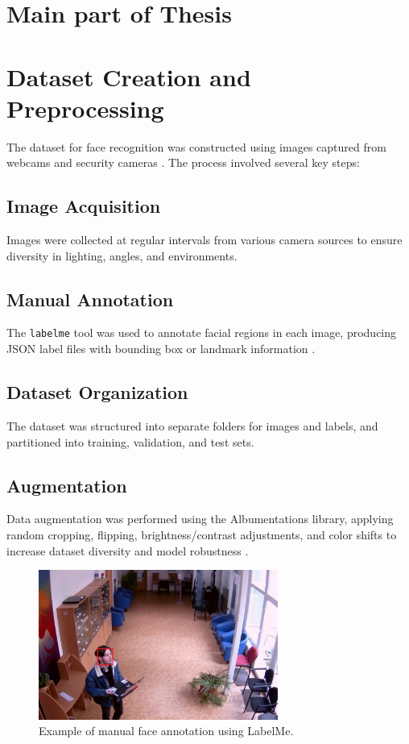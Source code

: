 \section{Main part of Thesis}


\section{Dataset Creation and Preprocessing}

The dataset for face recognition was constructed using images captured from webcams and security cameras \cite{kairos_secret_2018}. The process involved several key steps:

\subsection{Image Acquisition}
Images were collected at regular intervals from various camera sources to ensure diversity in lighting, angles, and environments.

\subsection{Manual Annotation}
The \texttt{labelme} tool was used to annotate facial regions in each image, producing JSON label files with bounding box or landmark information \cite{labelme}.

\subsection{Dataset Organization}
The dataset was structured into separate folders for images and labels, and partitioned into training, validation, and test sets.

\subsection{Augmentation}
Data augmentation was performed using the Albumentations library, applying random cropping, flipping, brightness/contrast adjustments, and color shifts to increase dataset diversity and model robustness \cite{albumentations}.

\begin{figure}[ht!]
    \centering
    \includegraphics[width=0.7\textwidth]{../Files/annotation_example.jpg}
    \caption{Example of manual face annotation using LabelMe.}
    \label{fig:annotation-example}
\end{figure}

